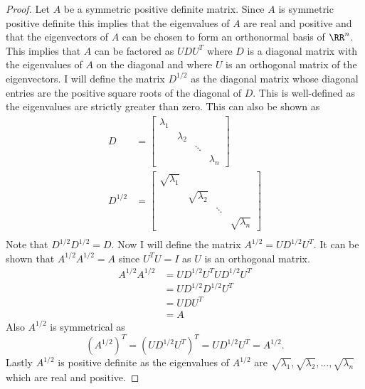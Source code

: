 \documentclass[11pt, oneside]{article}
\begin{document}
\begin{enumerate}
    \begin{proof}
      Let $A$ be a symmetric positive definite matrix.
      Since $A$ is symmetric positive definite this implies that the
      eigenvalues of $A$ are real and positive and that the eigenvectors of
      $A$ can be chosen to form an orthonormal basis of $\RR^n$.
      This implies that $A$ can be factored as $UDU^T$ where $D$ is a diagonal
      matrix with the eigenvalues of $A$ on the diagonal and where $U$ is an
      orthogonal matrix of the eigenvectors.
      I will define the matrix $D^{1/2}$ as the diagonal matrix whose diagonal
      entries are the positive square roots of the diagonal of $D$.
      This is well-defined as the eigenvalues are strictly greater than zero.
      This can also be shown as
      \begin{align*}
        D &=
        \begin{bmatrix}
          \lambda_1 & & \\
           & \lambda_2 & & \\
           & & \ddots & \\
           & & & \lambda_n
        \end{bmatrix} \\
        D^{1/2} &= 
        \begin{bmatrix}
          \sqrt{\lambda_1} & & \\
           & \sqrt{\lambda_2} & & \\
           & & \ddots & \\
           & & & \sqrt{\lambda_n}
        \end{bmatrix} \\
      \end{align*}
      Note that $D^{1/2} D^{1/2} = D$.
      Now I will define the matrix $A^{1/2} = U D^{1/2} U^T$.
      It can be shown that $A^{1/2} A^{1/2} = A$ since $U^T U = I$ as $U$ is an
      orthogonal matrix.
      \begin{align*}
        A^{1/2} A^{1/2} &= U D^{1/2} U^TU D^{1/2} U^T \\
        &= U D^{1/2} D^{1/2} U^T \\
        &= U D U^T \\
        &= A
      \end{align*}
      Also $A^{1/2}$ is symmetrical as
      \[
        (A^{1/2})^T = (U D^{1/2} U^T)^T = U D^{1/2} U^T = A^{1/2}.
      \]
      Lastly $A^{1/2}$ is positive definite as the eigenvalues of $A^{1/2}$ are
      $\sqrt{\lambda_1}, \sqrt{\lambda_2}, \ldots, \sqrt{\lambda_n}$ which are
      real and positive.


\end{proof}
\end{enumerate}
\end{document}
